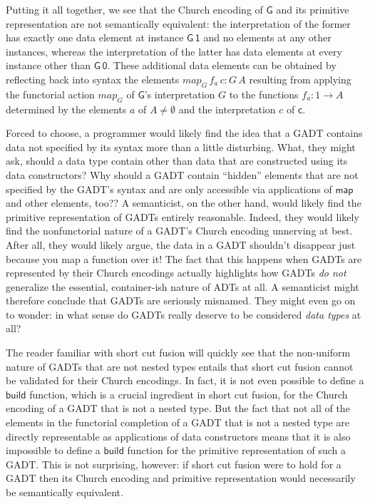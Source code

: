 \documentclass[acmsmall,screen,review,anonymous]{acmart}
\theoremstyle{definition}
\begin{document}
\begin{example}
Putting it all together, we see that the Church encoding of
$\mathsf{G}$ and its primitive representation are not semantically
equivalent: the interpretation of the former has exactly one data
element at instance $\mathsf{G\,1}$ and no elements at any other
instances, whereas the interpretation of the latter has data elements
at every instance other than $\mathsf{G\,0}$.
These additional data elements can be obtained by reflecting back into
syntax the elements $\mathit{map}_G\,f_a\,c : G\,A$ resulting from
applying the functorial action $\mathit{map}_G$ of $\mathsf{G}$'s
interpretation $G$ to the functions $f_a : 1 \to A$ determined by the
elements $a$ of $A \not = \emptyset$ and the interpretation $c$ of
$\mathsf{c}$.
\end{example}

Forced to choose, a programmer would likely find the idea that a GADT
contains data not specified by its syntax more than a little
disturbing. What, they might ask, should a data type contain other
than data that are constructed using its data constructors? Why should
a GADT contain ``hidden'' elements that are not specified by the
GADT's syntax and are only accessible via applications of
$\mathsf{map}$ {\color{blue} and other elements, too?}? A semanticist,
on the other hand, would likely find the primitive representation of
GADTs entirely reasonable. Indeed, they would likely find the
nonfunctorial nature of a GADT's Church encoding unnerving at
best. After all, they would likely argue, the data in a GADT shouldn't
disappear just because you map a function over it! The fact that this
happens when GADTs are represented by their Church encodings actually
highlights how GADTs {\em do not} generalize the essential,
container-ish nature of ADTs at all. A semanticist might therefore
conclude that GADTs are seriously misnamed. They might even go on to
wonder: in what sense do GADTs really deserve to be considered {\em
  data types} at all?

The reader familiar with short cut fusion will quickly see that the
non-uniform nature of GADTs that are not nested types entails that
short cut fusion cannot be validated for their Church encodings. In
fact, it is not even possible to define a $\mathsf{build}$ function,
which is a crucial ingredient in short cut fusion, for the Church
encoding of a GADT that is not a nested type. But the fact that not
all of the elements in the functorial completion of a GADT that is not
a nested type are directly representable as applications of data
constructors means that it is also impossible to define a
$\mathsf{build}$ function for the primitive representation of such a
GADT.  This is not surprising, however: if short cut fusion were to
hold for a GADT then its Church encoding and primitive representation
would necessarily be semantically equivalent.
\end{document}
